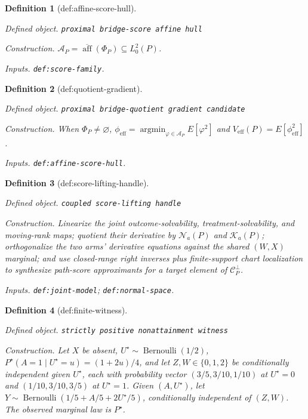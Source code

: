 \documentclass{article}
\newtheorem{definition}{Definition}
\begin{document}
\begin{definition}[def:affine-score-hull]\label{def:affine-score-hull}
\par\smallskip\noindent\emph{Defined object.} \texttt{proximal bridge-\allowbreak{}score affine hull}
\par\smallskip\noindent\emph{Construction.} \(\mathcal A_P=\overline{\operatorname{aff}}(\Phi_P)\subseteq L_0^2(P)\).
\par\smallskip\noindent\emph{Inputs.} \texttt{def:\allowbreak{}score-\allowbreak{}family}.
\end{definition}

\begin{definition}[def:quotient-gradient]\label{def:quotient-gradient}
\par\smallskip\noindent\emph{Defined object.} \texttt{proximal bridge-\allowbreak{}quotient gradient candidate}
\par\smallskip\noindent\emph{Construction.} When \(\Phi_P\neq\varnothing\), \(\phi_{\mathrm{eff}}=\operatorname*{argmin}_{\varphi\in\mathcal A_P}E[\varphi^2]\) and \(V_{\mathrm{eff}}(P)=E[\phi_{\mathrm{eff}}^2]\).
\par\smallskip\noindent\emph{Inputs.} \texttt{def:\allowbreak{}affine-\allowbreak{}score-\allowbreak{}hull}.
\end{definition}

\begin{definition}[def:score-lifting-handle]\label{def:score-lifting-handle}
\par\smallskip\noindent\emph{Defined object.} \texttt{coupled score-\allowbreak{}lifting handle}
\par\smallskip\noindent\emph{Construction.} Linearize the joint outcome-solvability, treatment-solvability, and moving-rank maps; quotient their derivative by \(\mathcal N_a(P)\) and \(\mathcal K_a(P)\); orthogonalize the two arms' derivative equations against the shared \((W,X)\) marginal; and use closed-range right inverses plus finite-support chart localization to synthesize path-score approximants for a target element of \(\mathcal C_P^\perp\).
\par\smallskip\noindent\emph{Inputs.} \texttt{def:\allowbreak{}joint-\allowbreak{}model}; \texttt{def:\allowbreak{}normal-\allowbreak{}space}.
\end{definition}

\begin{definition}[def:finite-witness]\label{def:finite-witness}
\par\smallskip\noindent\emph{Defined object.} \texttt{strictly positive nonattainment witness}
\par\smallskip\noindent\emph{Construction.} Let \(X\) be absent, \(U^\star\sim\operatorname{Bernoulli}(1/2)\), \(P^\star(A=1\mid U^\star=u)=(1+2u)/4\), and let \(Z,W\in\{0,1,2\}\) be conditionally independent given \(U^\star\), each with probability vector \((3/5,3/10,1/10)\) at \(U^\star=0\) and \((1/10,3/10,3/5)\) at \(U^\star=1\). Given \((A,U^\star)\), let \(Y\sim\operatorname{Bernoulli}(1/5+A/5+2U^\star/5)\), conditionally independent of \((Z,W)\). The observed marginal law is \(P^\star\).
\end{definition}
\end{document}
